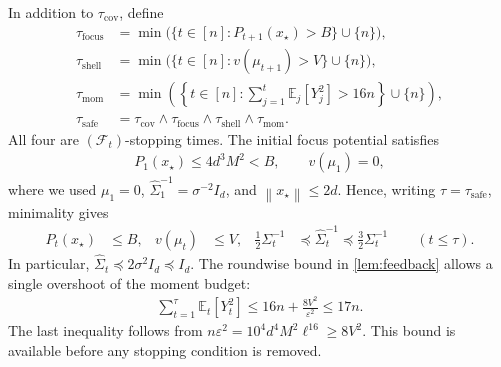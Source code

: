 \documentclass[11pt]{article}
\newcommand{\E}{\mathbb E}
\newcommand{\F}{\mathcal F}
\newcommand{\1}{\mathbf 1}
\newcommand{\eps}{\varepsilon}
\newcommand{\norm}[1]{\left\lVert #1\right\rVert}
\begin{document}
In addition to $\tau_{\mathrm{cov}}$, define
\begin{align}
    \tau_{\mathrm{focus}}
     & =\min\bigl(\{t\in[n]:P_{t+1}(x_\star)>B\}\cup\{n\}\bigr),
    \\
    \tau_{\mathrm{shell}}
     & =\min\bigl(\{t\in[n]:v(\mu_{t+1})>V\}\cup\{n\}\bigr),
    \\
    \tau_{\mathrm{mom}}
     & =\min\left(
    \left\{t\in[n]:\sum_{j=1}^t\E_j[Y_j^2]>16n\right\}
    \cup\{n\}\right),
    \\
    \tau_{\mathrm{safe}}
     & =\tau_{\mathrm{cov}}\wedge\tau_{\mathrm{focus}}
    \wedge\tau_{\mathrm{shell}}\wedge\tau_{\mathrm{mom}}.
    \label{eq:safe-stopping-time}
\end{align}
All four are $(\F_t)$-stopping times. The initial focus potential satisfies
\begin{align}
    P_1(x_\star)
    \leq4d^3M^2<B,
    \qquad v(\mu_1)=0,
    \label{eq:initial-focus}
\end{align}
where we used $\mu_1=0$, $\widehat\Sigma_1^{-1}=\sigma^{-2}I_d$, and
$\norm{x_\star}\leq2d$. Hence, writing $\tau=\tau_{\mathrm{safe}}$,
minimality gives
\begin{align}
    P_t(x_\star) & \leq B,
                 & v(\mu_t)                                                & \leq V,
                 & \frac12\Sigma_t^{-1}
                 & \preceq\widehat\Sigma_t^{-1}\preceq\frac32\Sigma_t^{-1}
    \qquad(t\leq\tau).
    \label{eq:stability-stopped-invariants}
\end{align}
In particular, $\widehat\Sigma_t\preceq2\sigma^2I_d\preceq I_d$.
The roundwise bound in \cref{lem:feedback} allows a single overshoot of
the moment budget:
\begin{align}
    \sum_{t=1}^\tau\E_t[Y_t^2]
    \leq16n+\frac{8V^2}{\eps^2}
    \leq17n.
    \label{eq:stopped-moment-budget}
\end{align}
The last inequality follows from
$n\eps^2=10^4d^4M^2\ell^{16}\geq8V^2$.
This bound is available before any stopping condition is removed.
\end{document}
